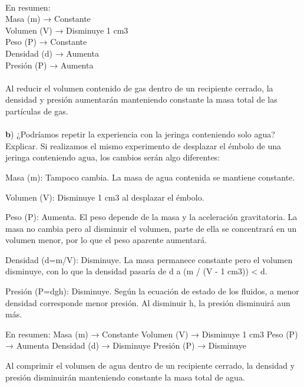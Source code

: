 \documentclass{article}
\begin{document}
\begin{itemize}
\\
En resumen:\\
Masa (m) → Constante\\
Volumen (V) → Disminuye 1 cm3\\
Peso (P) → Constante\\
Densidad (d) → Aumenta\\
Presión (P) → Aumenta\\
\\
Al reducir el volumen contenido de gas dentro de un recipiente cerrado, la densidad y presión aumentarán manteniendo constante la masa total de las partículas de gas.\\
\\
{\textbf b) ¿Podríamos repetir la experiencia con la jeringa conteniendo solo agua? Explicar. }
Si realizamos el mismo experimento de desplazar el émbolo de una jeringa conteniendo agua, los cambios serán algo diferentes:

Masa (m): Tampoco cambia. La masa de agua contenida se mantiene constante.

Volumen (V): Disminuye 1 cm3 al desplazar el émbolo.

Peso (P): Aumenta. El peso depende de la masa y la aceleración gravitatoria. La masa no cambia pero al disminuir el volumen, parte de ella se concentrará en un volumen menor, por lo que el peso aparente aumentará.

Densidad (d=m/V): Disminuye. La masa permanece constante pero el volumen disminuye, con lo que la densidad pasaría de d a (m / (V - 1 cm3)) < d.

Presión (P=dgh): Disminuye. Según la ecuación de estado de los fluidos, a menor densidad corresponde menor presión. Al disminuir h, la presión disminuirá aun más.

En resumen:
Masa (m) → Constante
Volumen (V) → Disminuye 1 cm3
Peso (P) → Aumenta
Densidad (d) → Disminuye
Presión (P) → Disminuye

Al comprimir el volumen de agua dentro de un recipiente cerrado, la densidad y presión disminuirán manteniendo constante la masa total de agua.


\end{itemize}
\end{document}
